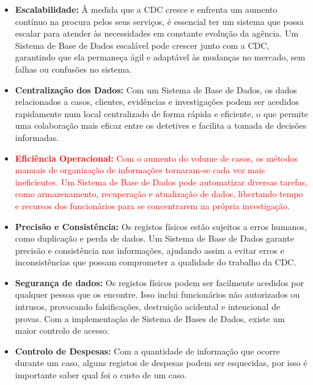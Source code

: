 \documentclass[a4paper,12pt]{scrreprt}
\begin{document}
    \begin{itemize}
        \item \textbf{Escalabilidade:} À medida que a CDC cresce e enfrenta um aumento contínuo na procura pelos
            seus serviços, é essencial ter um sistema que possa escalar para atender às necessidades em constante
            evolução da agência. Um Sistema de Base de Dados escalável pode crescer junto com a CDC, garantindo que
            ela permaneça ágil e adaptável às mudanças no mercado, sem falhas ou confusões no sistema.
        \item \textbf{Centralização dos Dados:} Com um Sistema de Base de Dados, os dados relacionados a
            casos, clientes, evidências e investigações podem ser acedidos rapidamente num local centralizado de
            forma rápida e eficiente, o que permite uma colaboração mais eficaz entre os detetives e facilita a
            tomada de decisões informadas.
        \item \textcolor{red}{
                \textbf{Eficiência Operacional:} Com o aumento do volume de casos, os métodos manuais de organização de informações tornaram-se cada vez mais ineficientes. Um Sistema de Base de Dados pode automatizar diversas tarefas, como armazenamento, recuperação e atualização de dados, libertando tempo e recursos dos funcionários para se concentrarem na própria investigação.
            }
        \item \textbf{Precisão e Consistência:} Os registos físicos estão sujeitos a erros humanos, como duplicação e perda de dados. Um Sistema de Base de Dados garante precisão e consistência nas informações, ajudando assim a evitar erros e inconsistências que possam comprometer a qualidade do trabalho da CDC.

        \item \textbf{Segurança de dados:} Os registos físicos podem ser facilmente acedidos por qualquer pessoa
            que os encontre. Isso inclui funcionários não autorizados ou intrusos, provocando falsificações, destruição
            acidental e intencional de provas. Com a implementação de Sistema de Bases de Dados, existe um maior
            controlo de acesso.
        \item \textbf{Controlo de Despesas:} Com a quantidade de informação que ocorre durante um caso, alguns registos de despesas podem ser esquecidas, por isso é importante saber qual foi o custo de um caso.
    \end{itemize}
\end{document}

